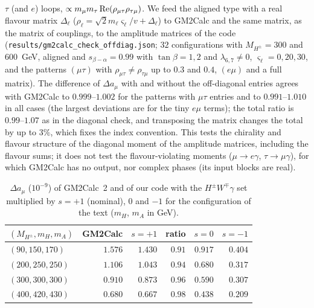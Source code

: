 \documentclass[twocolumn,epjc3]{svjour3}
\begin{document}
$\tau$ (and $e$) loops, $\propto m_\mu m_\tau\,{\rm Re}(\rho_{\mu\tau}\rho_{\tau\mu})$. We feed the aligned type with a real flavour matrix $\Delta_\ell$ ($\rho_\ell=\sqrt2m_\ell\varsigma_\ell/v+\Delta_\ell$) to GM2Calc and the same matrix, as the matrix of couplings, to the amplitude matrices of the code (\texttt{results/gm2calc\_check\_offdiag.json}; $32$ configurations with $M_{H^\pm}=300$ and $600$~GeV, aligned and $s_{\beta-\alpha}=0.99$ with $\tan\beta=1,2$ and $\lambda_{6,7}\ne0$, $\varsigma_\ell=0,20,30$, and the patterns $(\mu\tau)$ with $\rho_{\mu\tau}\ne\rho_{\tau\mu}$ up to $0.3$ and $0.4$, $(e\mu)$ and a full matrix). The difference of $\Delta a_\mu$ with and without the off-diagonal entries agrees with GM2Calc to $0.999$--$1.002$ for the patterns with $\mu\tau$ entries and to $0.991$--$1.010$ in all cases (the largest deviations are for the tiny $e\mu$ terms); the total ratio is $0.99$--$1.07$ as in the diagonal check, and transposing the matrix changes the total by up to $3\%$, which fixes the index convention. This tests the chirality and flavour structure of the diagonal moment of the amplitude matrices, including the flavour sums; it does not test the flavour-violating moments ($\mu\to e\gamma$, $\tau\to\mu\gamma$), for which GM2Calc has no output, nor complex phases (its input blocks are real).
\begin{table}[t]
\centering
\caption{$\Delta a_\mu$ ($10^{-9}$) of GM2Calc~2 and of our code with the $H^\pm W^\mp\gamma$ set multiplied by $s=+1$ (nominal), $0$ and $-1$ for the configuration of the text ($m_H$, $m_A$ in GeV).}\label{tab:gm2}
\begin{tabular}{lrrrrr}
\hline
$(M_{H^\pm},m_H,m_A)$ & GM2Calc & $s=+1$ & ratio & $s=0$ & $s=-1$\\
\hline
$(90,150,170)$ & $1.576$ & $1.430$ & $0.91$ & $0.917$ & $0.404$\\
$(200,250,250)$ & $1.106$ & $1.043$ & $0.94$ & $0.680$ & $0.317$\\
$(300,300,300)$ & $0.910$ & $0.873$ & $0.96$ & $0.590$ & $0.307$\\
$(400,420,430)$ & $0.680$ & $0.667$ & $0.98$ & $0.438$ & $0.209$\\
\hline
\end{tabular}
\end{table}
\end{document}
